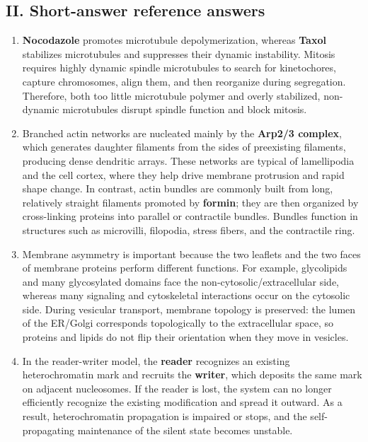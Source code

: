 \documentclass[12pt,fontset=none]{ctexart}
\begin{document}
\subsection*{II. Short-answer reference answers}
\begin{enumerate}
\item \textbf{Nocodazole} promotes microtubule depolymerization, whereas \textbf{Taxol} stabilizes microtubules and suppresses their dynamic instability. Mitosis requires highly dynamic spindle microtubules to search for kinetochores, capture chromosomes, align them, and then reorganize during segregation. Therefore, both too little microtubule polymer and overly stabilized, non-dynamic microtubules disrupt spindle function and block mitosis.

\item Branched actin networks are nucleated mainly by the \textbf{Arp2/3 complex}, which generates daughter filaments from the sides of preexisting filaments, producing dense dendritic arrays. These networks are typical of lamellipodia and the cell cortex, where they help drive membrane protrusion and rapid shape change. In contrast, actin bundles are commonly built from long, relatively straight filaments promoted by \textbf{formin}; they are then organized by cross-linking proteins into parallel or contractile bundles. Bundles function in structures such as microvilli, filopodia, stress fibers, and the contractile ring.

\item Membrane asymmetry is important because the two leaflets and the two faces of membrane proteins perform different functions. For example, glycolipids and many glycosylated domains face the non-cytosolic/extracellular side, whereas many signaling and cytoskeletal interactions occur on the cytosolic side. During vesicular transport, membrane topology is preserved: the lumen of the ER/Golgi corresponds topologically to the extracellular space, so proteins and lipids do not flip their orientation when they move in vesicles.

\item In the reader-writer model, the \textbf{reader} recognizes an existing heterochromatin mark and recruits the \textbf{writer}, which deposits the same mark on adjacent nucleosomes. If the reader is lost, the system can no longer efficiently recognize the existing modification and spread it outward. As a result, heterochromatin propagation is impaired or stops, and the self-propagating maintenance of the silent state becomes unstable.


\end{enumerate}
\end{document}
